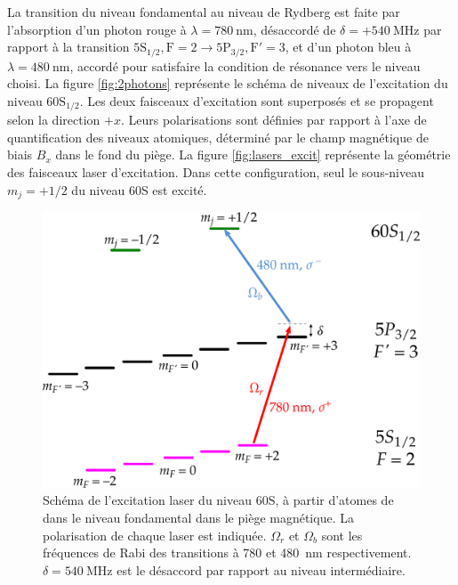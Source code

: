 La transition du niveau fondamental au niveau de Rydberg est faite par l'absorption d'un photon rouge à $\lambda = \SI{780}{\nano\meter}$, désaccordé de $\delta=+\SI{540}{\MHz}$ par rapport à la transition $\mathrm{5S_{1/2},F=2 \rightarrow 5P_{3/2},F'=3}$, et d'un photon bleu à $\lambda = \SI{480}{\nano\meter}$, accordé pour satisfaire la condition de résonance vers le niveau choisi.
La figure \eqref{fig:2photons} représente le schéma de niveaux de l'excitation du niveau $\mathrm{60S_{1/2}}$.
Les deux faisceaux d'excitation sont superposés et se propagent selon la direction $+x$. Leurs polarisations sont définies par rapport à l'axe de quantification des niveaux atomiques, déterminé par le champ magnétique de biais $B_x$ dans le fond du piège.
La figure \eqref{fig:lasers_excit} représente la géométrie des faisceaux laser d'excitation.
Dans cette configuration, seul le sous-niveau $m_j=+1/2$ du niveau 60S est excité.
%
\begin{figure}[!h]
\centering
\includegraphics[width=.8\linewidth]{figures/2photons}
\caption[Excitation du niveau 60S]{Schéma de l'excitation laser du niveau 60S, à partir d'atomes de  dans le niveau fondamental dans le piège magnétique.
La polarisation de chaque laser est indiquée.
$\Omega_r$ et $\Omega_b$ sont les fréquences de Rabi des transitions à \num{780} et \SI{480}{\nano\meter} respectivement.
$\delta=\SI{540}{\MHz}$ est le désaccord par rapport au niveau intermédiaire.
}
\label{fig:2photons}
\end{figure}

